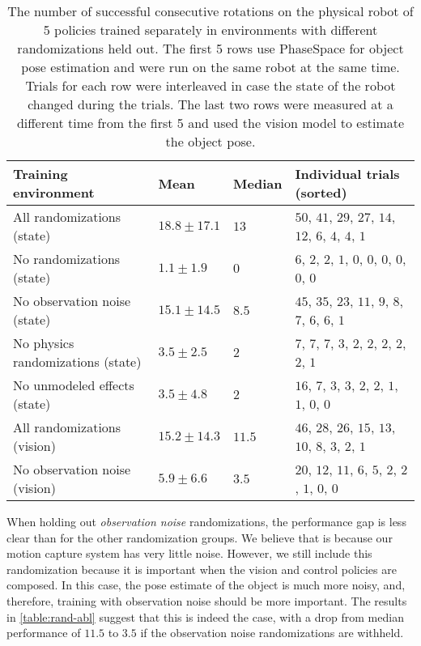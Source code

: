 \begin{table}[h]
    \centering
    \caption{
    The number of successful consecutive rotations on the physical robot of 5 policies trained separately in environments with different randomizations held out.
    The first 5 rows use PhaseSpace for object pose estimation and were run on the same robot at the same time. Trials for each row were interleaved in case the state of the robot changed during the trials. The last two rows were measured at a different time from the first 5 and used the vision model to estimate the object pose.
    }
    \renewcommand{\arraystretch}{1.3}
    \begin{tabular}{@{}llll@{}}
        \toprule
        \textbf{Training environment} & \textbf{Mean} & \textbf{Median} & \textbf{Individual trials (sorted)} \\ 
        \midrule
        All randomizations (state) & $18.8 \pm 17.1$  & $13$ & $50$, $41$, $29$, $27$, $14$, $12$, $6$, $4$, $4$, $1$ \\
        No randomizations (state) & $1.1 \pm 1.9$ & $0$ & $6$, $2$, $2$, $1$, $0$, $0$, $0$, $0$, $0$, $0$ \\
        No observation noise (state) & $15.1 \pm 14.5$ & $8.5$ & $45$, $35$, $23$, $11$, $9$, $8$, $7$, $6$, $6$, $1$ \\
        No physics randomizations (state) & $3.5 \pm 2.5$ & $2$ & $7$, $7$, $7$, $3$, $2$, $2$, $2$, $2$, $2$, $1$ \\
        No unmodeled effects (state) & $3.5 \pm 4.8$ & $2$ & $16$, $7$, $3$, $3$, $2$, $2$, $1$, $1$, $0$, $0$ \\
        \midrule
        All randomizations (vision) & $15.2 \pm 14.3$ & $11.5$ & $46$, $28$, $26$, $15$, $13$, $10$, $8$, $3$, $2$, $1$ \\
        No observation noise (vision) & $5.9 \pm 6.6$ & $3.5$ & $20$, $12$, $11$, $6$, $5$, $2$, $2$, $1$, $0$, $0$ \\
    \bottomrule
    \end{tabular}
    \label{table:rand-abl}
\end{table}

When holding out \emph{observation noise} randomizations, the performance gap is less clear than for the other randomization groups.
We believe that is because our motion capture system has very little noise.
However, we still include this randomization because it is important when the vision and control policies are composed.
In this case, the pose estimate of the object is much more noisy, and, therefore, training with observation noise should be more important.
The results in \autoref{table:rand-abl} suggest that this is indeed the case, with a drop from median performance of $11.5$ to $3.5$ if the observation noise randomizations are withheld.

